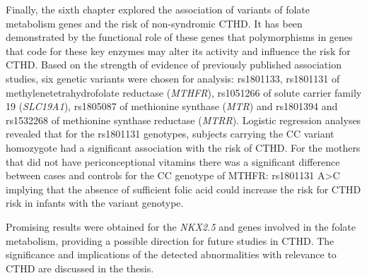 Finally, the sixth chapter explored the association of variants of folate metabolism genes and the risk of non-syndromic CTHD. It has been demonstrated by the functional role of these genes that polymorphisms in genes that code for these key enzymes may alter its activity and influence the risk for CTHD. Based on the strength of evidence of previously published association studies, six genetic variants were chosen for analysis: rs1801133, rs1801131 of methylenetetrahydrofolate reductase (\textit{MTHFR}), rs1051266 of solute carrier family 19 (\textit{SLC19A1}), rs1805087 of methionine synthase (\textit{MTR}) and rs1801394 and rs1532268 of methionine synthase reductase (\textit{MTRR}). Logistic regression analyses revealed that for the rs1801131 genotypes, subjects carrying the CC variant homozygote had a significant association with the risk of CTHD. For the mothers that did not have periconceptional vitamins there was a significant difference between cases and controls for the CC genotype of MTHFR: rs1801131 A>C implying that the absence of sufficient folic acid could increase the risk for CTHD risk in infants with the variant genotype. 

Promising results were obtained for the \textit{NKX2.5} and genes involved in the folate metabolism, providing a possible direction for future studies in CTHD. The significance and implications of the detected abnormalities with relevance to CTHD are discussed in the thesis.
